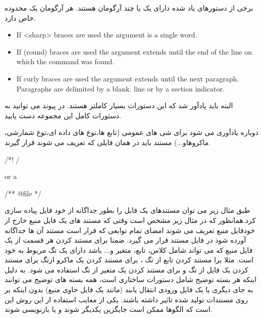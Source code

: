 برخی از دستورهای یاد شده دارای یک یا چند آرگومان هستند. هر آرگومان یک محدوده خاص دارد.

\begin{itemize}
  \item     If <sharp> braces are used the argument is a single word.
  \item     If (round) braces are used the argument extends until the end of the line on which the command was found.
  \item     If {curly} braces are used the argument extends until the next paragraph. Paragraphs are delimited by a blank. line or by a section indicator.
\end{itemize}

البته باید یادآور شد که این دستورات بسیار کاملتر هستند.
در پیوند \cite{doxycommand} می توانید به دستورات کامل این مجموعه دست یابید.

دوباره یادآوری می شود برای شی های عمومی (تابع ها،توع های داده ای،توع شمارشی،
ماکروهاو...) مستند باید در همان فایلی که تعریف می شوند قرار گیرند.

\begin{C++}
/*! \file */

or a

/** @file */
\end{C++}

طبق مثال زیر می توان مستندهای یک فایل را بطور جداگانه از خود فایل پیاده سازی
کرد.همانطور که در مثال زیر مشخص است وقتی که مستند های یک فایل منبع  خارج از
خودفایل منبع تعریف می شوند امضای تمام توابعی که قرار است مستند آن ها جداگانه
آورده شود در فایل مستند قرار می گیرد. ضمنا برای مستند کردن هر قسمت از یک فایل
منبع که می تواند شامل کلاس، تابع، متغیر و... باشد دارای یک تگ مربوط  به خود است.
مثلا برا مستند کردن تابع از تگ ، برای مستند کردن یک ماکرو ازتگ
 برای مستند کردن یک فایل از تگ  و برای مستند کردن یک متغیر
از تگ  استفاده می شود. به دلیل اینکه هر بسته توضیح شامل دستورات
ساختاری است، همه بسته های توضیح می توانند به جای دیگری یا یک فایل ورودی
انتقال یابند (مانند یک فایل حاوی منبع) بدون اینکه بر روی مستندات تولید شده تاثیر
داشته باشند. یکی از معایب استفاده از این روش این است که الگوها ممکن است جایگزین
یکدیگر شوند و یا بازنویسی شوند.

